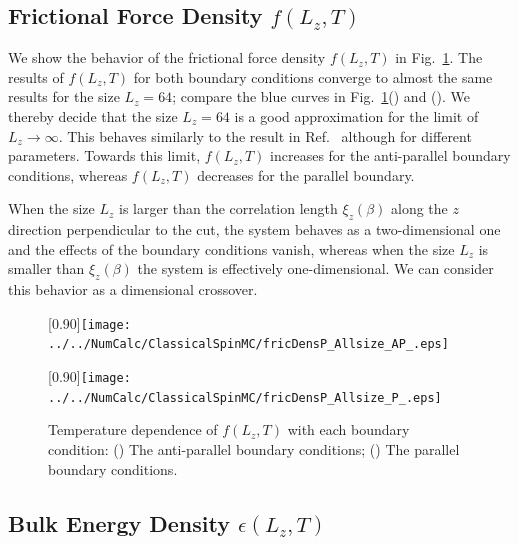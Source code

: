\subsection{Frictional Force Density $f(L_{z}, T)$}

We show the behavior of the frictional force density $f(L_{z}, T)$ in Fig.~\ref{fig:fricDens_Allsize}. The results of $f(L_{z},T)$ for both boundary conditions converge to almost the same results for the size $L_{z}=64$; compare the blue curves in Fig.~\ref{fig:fricDens_Allsize}() and (). We thereby decide that the size $L_{z}=64$ is a good approximation for the limit of $L_{z}\to\infty$. This behaves similarly to the result in Ref.~\cite{Kadau2008} although for different parameters. Towards this limit, $f(L_{z}, T)$ increases for the anti-parallel boundary conditions, whereas $f(L_{z}, T)$ decreases for the parallel boundary. 

When the size $L_{z}$ is larger than the correlation length $\xi_{z}(\beta)$ along the $z$ direction perpendicular to the cut, the system behaves as a two-dimensional one and the effects of the boundary conditions vanish, whereas when the size $L_{z}$ is smaller than $\xi_{z}(\beta)$ the system is effectively one-dimensional. We can consider this behavior as a dimensional crossover. 

\begin{figure}[htbp]
	\centering
	\subcaptionbox{\label{fig:fricDens_Allsize_AP}}[0.90\linewidth]{\texttt{[image: ../../NumCalc/ClassicalSpinMC/fricDensP\_Allsize\_AP\_.eps]}}
	
	\subcaptionbox{\label{fig:fricDens_Allsize_P}}[0.90\linewidth]{\texttt{[image: ../../NumCalc/ClassicalSpinMC/fricDensP\_Allsize\_P\_.eps]}}
	
	\caption{Temperature dependence of $f(L_{z}, T)$ with each boundary condition: () The anti-parallel boundary conditions; () The parallel boundary conditions.}
	\label{fig:fricDens_Allsize}
\end{figure}



\subsection{Bulk Energy Density $\epsilon(L_{z}, T)$}

